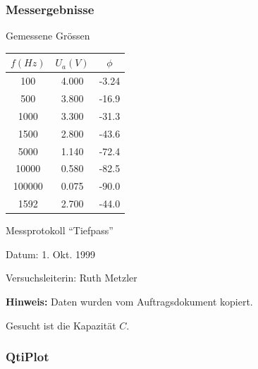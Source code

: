 \subsubsection*{Messergebnisse}

\bgroup
    \setlength\tabcolsep{8mm}
    \begin{center}
        \begin{threeparttable}
            \caption{Gemessene Gr\"ossen}
            \begin{tabular}{ccc}
                \toprule
                $f(Hz)$  &  $U_a(V)$    &  $\phi$ \\
                \midrule
                100      & 4.000        & -3.24   \\
                500      & 3.800        & -16.9   \\
                1000     & 3.300        & -31.3   \\
                1500     & 2.800        & -43.6   \\
                5000     & 1.140        & -72.4   \\
                10000    & 0.580        & -82.5   \\
                100000   & 0.075        & -90.0   \\
                1592     & 2.700        & -44.0   \\
                \bottomrule
            \end{tabular}
            \begin{tablenotes}
                \small
                \item Messprotokoll ``Tiefpass''
                \item Datum: 1. Okt. 1999
                \item Versuchsleiterin: Ruth Metzler
                \item \textbf{Hinweis:} Daten wurden vom Auftragsdokument kopiert.
            \end{tablenotes}
            \label{tab:rc}
        \end{threeparttable}
    \end{center}
\egroup

Gesucht ist die Kapazit\"at $C$.


\subsubsection*{QtiPlot}

